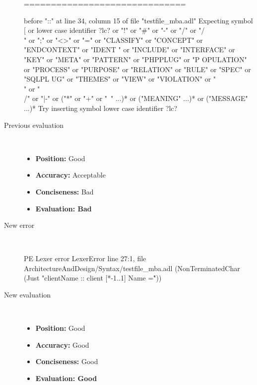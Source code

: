 \begin{description}
\begin{haskell}
==============================

before "::" at line 34, column 15 of file "testfile_mba.adl"
Expecting symbol [ or lower case identifier ?lc? or "!" or "#" or "-" or "/" or
"/\\" or ";" or "<>" or "=" or "CLASSIFY" or "CONCEPT" or "ENDCONTEXT" or "IDENT
" or "INCLUDE" or "INTERFACE" or "KEY" or "META" or "PATTERN" or "PHPPLUG" or "P
OPULATION" or "PROCESS" or "PURPOSE" or "RELATION" or "RULE" or "SPEC" or "SQLPL
UG" or "THEMES" or "VIEW" or "VIOLATION" or "\\" or "\\/" or "|-" or ("*" or "+"
 or "~" ...)* or ("MEANING" ...)* or ("MESSAGE" ...)*
Try inserting symbol lower case identifier ?lc?
\end{haskell}
  \item[Previous evaluation]~\\
    \begin{itemize}
    \item \textbf{Position:} Good
    \item \textbf{Accuracy:} Acceptable
    \item \textbf{Conciseness:} Bad
    \item \textbf{Evaluation: Bad}
    \end{itemize}
  \item[New error]~\\
\begin{haskell}
PE Lexer error LexerError line 27:1, file ArchitectureAndDesign/Syntax/testfile_mba.adl (NonTerminatedChar (Just "clientName :: client [*-1..1] Name =\r"))\end{haskell}
  \item[New evaluation]~\\
    \begin{itemize}
    \item \textbf{Position:} Good
    \item \textbf{Accuracy:} Good
    \item \textbf{Conciseness:} Good
    \item \textbf{Evaluation: Good}
    \end{itemize}
  \end{description}

\hrulefill

